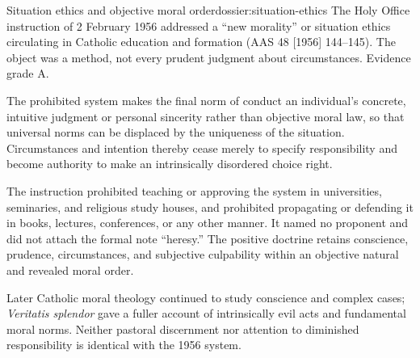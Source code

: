 \begin{heresydossier}{Situation ethics and objective moral order}{dossier:situation-ethics}
\objectfield The Holy Office instruction of 2 February 1956 addressed a ``new morality'' or situation ethics circulating in Catholic education and formation (AAS 48 [1956] 144--145). The object was a method, not every prudent judgment about circumstances. Evidence grade A.

\propositionfield The prohibited system makes the final norm of conduct an individual's concrete, intuitive judgment or personal sincerity rather than objective moral law, so that universal norms can be displaced by the uniqueness of the situation. Circumstances and intention thereby cease merely to specify responsibility and become authority to make an intrinsically disordered choice right.

\responsefield The instruction prohibited teaching or approving the system in universities, seminaries, and religious study houses, and prohibited propagating or defending it in books, lectures, conferences, or any other manner. It named no proponent and did not attach the formal note ``heresy.'' The positive doctrine retains conscience, prudence, circumstances, and subjective culpability within an objective natural and revealed moral order.

\aftermathfield Later Catholic moral theology continued to study conscience and complex cases; \emph{Veritatis splendor} gave a fuller account of intrinsically evil acts and fundamental moral norms. Neither pastoral discernment nor attention to diminished responsibility is identical with the 1956 system.
\end{heresydossier}

